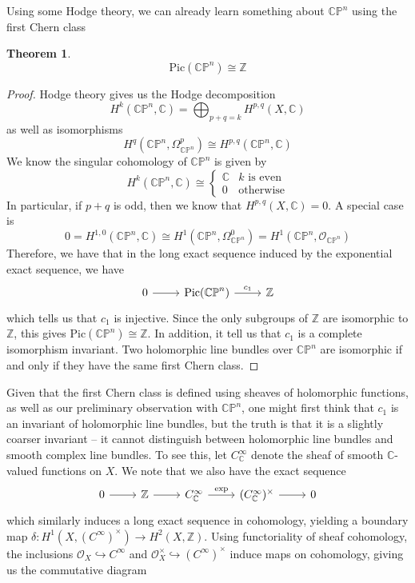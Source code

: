 \documentclass[psamsfonts, 12pt]{amsart}
\newtheorem{thm}{Theorem}[section]
\theoremstyle{definition}
\theoremstyle{remark}
\renewcommand{\O}{\mathcal{O}}
\newcommand{\Z}{\mathbb{Z}}
\newcommand{\C}{\mathbb{C}}
\newcommand{\CP}{\mathbb{CP}}
\begin{document}
Using some Hodge theory, we can already learn something about
$\CP^n$ using the first Chern class
%
\begin{thm}
\[
\mathrm{Pic}(\CP^n) \cong \Z
\]
\end{thm}
%
\begin{proof}
Hodge theory gives us the Hodge decomposition
\[
H^k(\CP^n, \C) = \bigoplus_{p+q=k} H^{p,q}(X, \C)
\]
as well as isomorphisms
\[
H^q(\CP^n, \Omega^p_{\CP^n}) \cong H^{p,q}(\CP^n, \C)
\]
We know the singular cohomology of $\CP^n$ is given by
\[
H^k(\CP^n, \C) \cong \begin{cases}
\C & k \text{ is even} \\
0 & \text{otherwise}
\end{cases}
\]
In particular, if $p+q$ is odd, then we know that $H^{p,q}(X,\C) = 0$.
A special case is
\[
0 = H^{1,0}(\CP^n, \C) \cong H^1(\CP^n, \Omega^0_{\CP^n}) = H^1(\CP^n, \O_{\CP^n})
\]
Therefore, we have that in the long exact sequence induced by the exponential exact
sequence, we have
\[\begin{tikzcd}
0 \ar[r] & \mathrm{Pic}(\CP^n) \ar[r, "c_1"] & \Z
\end{tikzcd}\]
which tells us that $c_1$ is injective. Since the only subgroups of $\Z$
are isomorphic to $\Z$, this gives $\mathrm{Pic}(\CP^n) \cong \Z$. In addition,
it tell us that $c_1$ is a complete isomorphism invariant. Two holomorphic line bundles
over $\CP^n$ are isomorphic if and only if they have the same first Chern class.
\end{proof}
%
Given that the first Chern class is defined using sheaves of holomorphic functions,
as well as our preliminary observation with $\CP^n$, one might first think that $c_1$ is
an invariant of holomorphic line bundles, but the truth is that it is a slightly coarser
invariant -- it cannot distinguish between holomorphic line bundles and smooth complex
line bundles. To see this, let $C^\infty_\C$ denote the sheaf of smooth $\C$-valued
functions on $X$. We note that we also have the exact sequence
\[\begin{tikzcd}
0 \ar[r] & \Z \ar[r] & C_\C^\infty \ar[r, "\mathrm{exp}"] & (C_\C^\infty)^\times \ar[r] & 0
\end{tikzcd}\]
which similarly induces a long exact sequence in cohomology, yielding a boundary
map $\delta : H^1(X, (C^\infty)^\times) \to H^2(X, \Z)$. Using functoriality
of sheaf cohomology, the inclusions $\O_X \hookrightarrow C^\infty$ and
$\O_X^\times \hookrightarrow (C^\infty)^\times$ induce maps on cohomology, giving
us the commutative diagram
\end{document}
